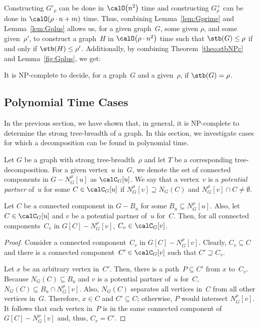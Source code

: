 Constructing $G'_\rho$ can be done in $\calO \big( n^2 \big)$ time and constructing $G_\rho^+$ can be done in $\calO(\rho \cdot n + m)$ time.
Thus, combining Lemma~\ref{lem:Gprime} and Lemma~\ref{lem:Gplus} allows us, for a given graph~$G$, some given $\rho$, and some given~$\rho'$, to construct a graph~$H$ in $\calO \big( \rho \cdot n^2 \big)$ time such that $\stb(G) \leq \rho$ if and only if $\stb(H) \leq \rho'$.
Additionally, by combining Theorem~\ref{theo:stbNPc} and Lemma~\ref{fig:Gplus}, we get:

\begin{theorem}
It is NP-complete to decide, for a graph~\( G \) and a given~\( \rho \), if \( \stb(G) = \rho \).
\end{theorem}


\subsection{Polynomial Time Cases}

In the previous section, we have shown that, in general, it is NP-complete to determine the strong tree-breadth of a graph.
In this section, we investigate cases for which a decomposition can be found in polynomial time.

Let $G$ be a graph with strong tree-breadth~$\rho$ and let $T$ be a corresponding tree-decomposition.
For a given vertex~$u$ in~$G$, we denote the set of connected components in $G - N_G^\rho[u]$ as $\calC_G[u]$.
We say that a vertex~$v$ is a \emph{potential partner} of~$u$ for some $C \in \calC_G[u]$ if $N_G^\rho[v] \supseteq N_G(C)$ and $N_G^\rho[v] \cap C \neq \emptyset$.

\begin{lemma}
    \label{lem:potPartProp}
Let \( C \) be a connected component in \( G - B_u \) for some \( B_u \subseteq N_G^\rho[u] \).
Also, let \( C \in \calC_G[u] \) and \( v \) be a potential partner of~\( u \) for~\( C \).
Then, for all connected components~\( C_v \) in \( G[C] - N_G^\rho[v] \), \( C_v \in \calC_G[v] \).
\end{lemma}

\begin{proof}
Consider a connected component~$C_v$ in $G[C] - N_G^\rho[v]$.
Clearly, $C_v \subseteq C$ and there is a connected component~$C' \in \calC_G[v]$ such that $C' \supseteq C_v$.

Let $x$ be an arbitrary vertex in~$C'$.
Then, there is a path~$P \subseteq C'$ from $x$ to~$C_v$.
Because $N_G(C) \subseteq B_u$ and $v$ is a potential partner of~$u$ for~$C$, $N_G(C) \subseteq B_u \cap N_G^\rho[v]$.
Also, $N_G(C)$ separates all vertices in~$C$ from all other vertices in~$G$.
Therefore, $x \in C$ and $C' \subseteq C$; otherwise, $P$ would intersect $N_G^\rho[v]$.
It follows that each vertex in~$P$ is in the same connected component of~$G[C] - N_G^\rho[v]$ and, thus, $C_v = C'$.
\end{proof}

